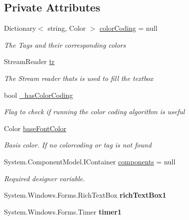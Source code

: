 \subsection*{Private Attributes}
\begin{DoxyCompactItemize}
\item 
Dictionary$<$ string, Color $>$ \mbox{\hyperlink{class_a_d_l_1_1_custom_c_m_d_1_1_custom_c_m_d_form_a705b940da9cebdc776afa008f2fe9bd7}{color\+Coding}} = null
\begin{DoxyCompactList}\small\item\em The Tags and their corresponding colors \end{DoxyCompactList}\item 
Stream\+Reader \mbox{\hyperlink{class_a_d_l_1_1_custom_c_m_d_1_1_custom_c_m_d_form_ab41ba63fa3294b392164af4868c326c3}{tr}}
\begin{DoxyCompactList}\small\item\em The Stream reader thats is used to fill the textbox \end{DoxyCompactList}\item 
bool \mbox{\hyperlink{class_a_d_l_1_1_custom_c_m_d_1_1_custom_c_m_d_form_a55c77dfaef33d120690074e8625d72fc}{\+\_\+has\+Color\+Coding}}
\begin{DoxyCompactList}\small\item\em Flag to check if running the color coding algorithm is useful \end{DoxyCompactList}\item 
Color \mbox{\hyperlink{class_a_d_l_1_1_custom_c_m_d_1_1_custom_c_m_d_form_a6c9c3fb863ccacd91e8d86cffb248595}{base\+Font\+Color}}
\begin{DoxyCompactList}\small\item\em Basis color. If no colorcoding or tag is not found \end{DoxyCompactList}\item 
System.\+Component\+Model.\+I\+Container \mbox{\hyperlink{class_a_d_l_1_1_custom_c_m_d_1_1_custom_c_m_d_form_a9e6d11d5b23133dffd23871d74bb4978}{components}} = null
\begin{DoxyCompactList}\small\item\em Required designer variable. \end{DoxyCompactList}\item 
\mbox{\label{class_a_d_l_1_1_custom_c_m_d_1_1_custom_c_m_d_form_a02018c332e924c21cff4afdeb9a9b3a5}} 
System.\+Windows.\+Forms.\+Rich\+Text\+Box {\bfseries rich\+Text\+Box1}
\item 
\mbox{\label{class_a_d_l_1_1_custom_c_m_d_1_1_custom_c_m_d_form_a59bb91294217ae85f9376390b5c47fee}} 
System.\+Windows.\+Forms.\+Timer {\bfseries timer1}
\end{DoxyCompactItemize}


